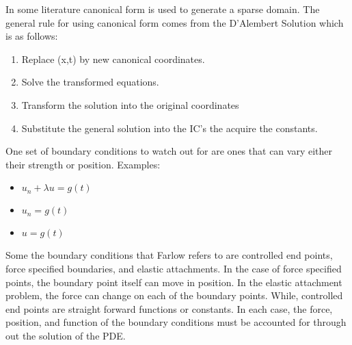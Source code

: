 \documentclass[11pt]{article}
\begin{document}
In some literature canonical form is used to generate a sparse domain.  The general rule for using canonical form comes from the D'Alembert Solution which is as follows:
\begin{enumerate}
\item Replace (x,t) by new canonical coordinates.
\item Solve the transformed equations.
\item Transform the solution into the original coordinates
\item Substitute the general solution into the IC's the acquire the constants. 
\end{enumerate}


One set of boundary conditions to watch out for are ones that can vary either their strength or position.  Examples:
\begin{itemize}
\item $u_n + \lambda u = g(t)$
\item $u_n =g(t) $
\item $u = g(t) $
\end{itemize}

Some the boundary conditions that Farlow \cite{PDEfSE} refers to are controlled end points, force specified boundaries, and elastic attachments.  In the case of force specified points, the boundary point itself can move in position.  In the elastic attachment problem, the force can change on each of the boundary points.  While, controlled end points are straight forward functions or constants.   In each case, the force, position, and function of the boundary conditions must be accounted for through out the solution of the PDE.  
\end{document}
